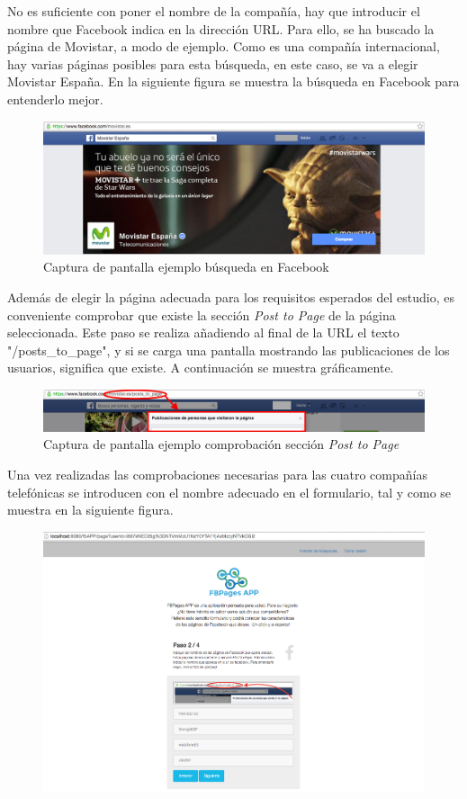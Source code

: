 \begin{itemize}
\begin{enumerate}
No es suficiente con poner el nombre de la compañía, hay que introducir el nombre que Facebook indica en la dirección URL. Para ello, se ha buscado la página de Movistar, a modo de ejemplo. Como es una compañía internacional, hay varias páginas posibles para esta búsqueda, en este caso, se va a elegir Movistar España.  En la siguiente figura se muestra la búsqueda en Facebook para entenderlo mejor.
\begin{figure}[H]
\centering
\includegraphics[width=5in]{figuras/ejemploFacebook.png}
\caption{Captura de pantalla ejemplo búsqueda en Facebook} \label{fig:exFacebook}
\end{figure}
Además de elegir la página adecuada para los requisitos esperados del estudio, es conveniente comprobar que existe la sección \textit{Post to Page} de la página seleccionada. Este paso se realiza añadiendo al final de la URL el texto "/posts\_to\_page", y si se carga una pantalla mostrando las publicaciones de los usuarios, significa que existe. A continuación se muestra gráficamente.
\begin{figure}[H]
\centering
\includegraphics[width=5in]{figuras/ejemploPostToPage.png}
\caption{Captura de pantalla ejemplo comprobación sección \textit{Post to Page}} \label{fig:exPostToPage}
\end{figure}
Una vez realizadas las comprobaciones necesarias para las cuatro compañías telefónicas se introducen con el nombre adecuado en el formulario, tal y como se muestra en la siguiente figura.
\begin{figure}[H]
\centering
\includegraphics[width=5in]{figuras/ejemploPaso2.png}

\end{figure}
\end{enumerate}
\end{itemize}
